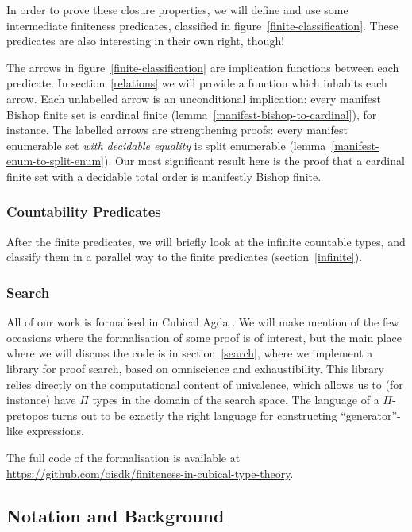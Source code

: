 In order to prove these closure properties, we will define and use some
intermediate finiteness predicates, classified in
figure~\ref{finite-classification}.
These predicates are also interesting in their own right, though!

The arrows in figure~\ref{finite-classification} are implication functions
between each predicate.
In section~\ref{relations} we will provide a function which inhabits each arrow.
Each unlabelled arrow is an unconditional implication: every manifest Bishop
finite set is cardinal finite (lemma~\ref{manifest-bishop-to-cardinal}), for
instance.
The labelled arrows are strengthening proofs: every manifest enumerable set
\emph{with decidable equality} is split enumerable
(lemma~\ref{manifest-enum-to-split-enum}).
Our most significant result here is the proof that a cardinal finite set with a
decidable total order is manifestly Bishop finite.

\subsubsection{Countability Predicates}
After the finite predicates, we will briefly look at the infinite countable
types, and classify them in a parallel way to the finite predicates
(section~\ref{infinite}).
\subsubsection{Search}
All of our work is formalised in Cubical Agda
\cite{vezzosiCubicalAgdaDependently2019}.
We will make mention of the few occasions where the formalisation of some proof
is of interest, but the main place where we will discuss the code is in
section~\ref{search}, where we implement a library for proof search, based on
omniscience and exhaustibility.
This library relies directly on the computational content of univalence, which
allows us to (for instance) have \(\Pi\) types in the domain of the search
space.
The language of a \(\Pi\)-pretopos turns out to be exactly the right language
for constructing ``generator''-like expressions.

The full code of the formalisation is available at
\url{https://github.com/oisdk/finiteness-in-cubical-type-theory}.
\subsection{Notation and Background}
